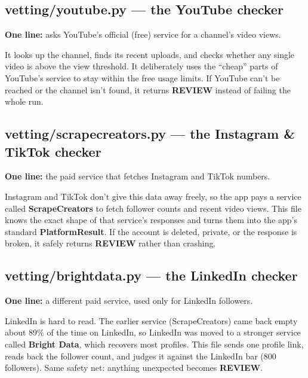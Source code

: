 \documentclass[11pt]{article}
\newcommand{\term}[1]{\textbf{\color{brandpurple}#1}}
\begin{document}
\subsection{vetting/youtube.py — the YouTube checker}
\begin{plainbox}
\textbf{One line:} asks YouTube's official (free) service for a channel's video
views.
\end{plainbox}

It looks up the channel, finds its recent uploads, and checks whether any single
video is above the view threshold. It deliberately uses the ``cheap'' parts of
YouTube's service to stay within the free usage limits. If YouTube can't be
reached or the channel isn't found, it returns \term{REVIEW} instead of
failing the whole run.

\subsection{vetting/scrapecreators.py — the Instagram \& TikTok checker}
\begin{plainbox}
\textbf{One line:} the paid service that fetches Instagram and TikTok numbers.
\end{plainbox}

Instagram and TikTok don't give this data away freely, so the app pays a service
called \term{ScrapeCreators} to fetch follower counts and recent video views.
This file knows the exact shape of that service's responses and turns them into
the app's standard \term{PlatformResult}. If the account is deleted, private, or
the response is broken, it safely returns \term{REVIEW} rather than crashing.

\subsection{vetting/brightdata.py — the LinkedIn checker}
\begin{plainbox}
\textbf{One line:} a different paid service, used only for LinkedIn followers.
\end{plainbox}

LinkedIn is hard to read. The earlier service (ScrapeCreators) came back empty
about 89\% of the time on LinkedIn, so LinkedIn was moved to a stronger service
called \term{Bright Data}, which recovers most profiles. This file sends one
profile link, reads back the follower count, and judges it against the LinkedIn
bar (800 followers). Same safety net: anything unexpected becomes \term{REVIEW}.
\end{document}
